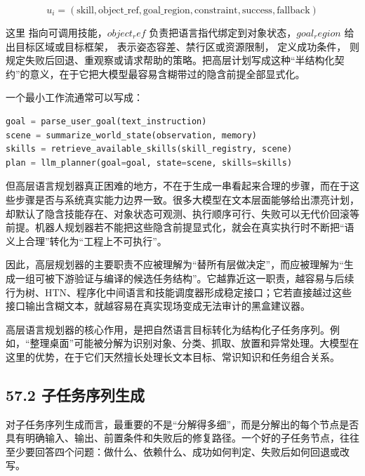 \begingroup
\scriptsize
\begin{equation*}
u_i = (\text{skill}, \text{object\_ref}, \text{goal\_region}, \text{constraint}, \text{success}, \text{fallback})
\end{equation*}
\endgroup

这里 \texttt{} 指向可调用技能，\(object_ref\) 负责把语言指代绑定到对象状态，\(goal_region\) 给出目标区域或目标框架，\texttt{} 表示姿态容差、禁行区或资源限制，\texttt{} 定义成功条件，\texttt{} 则规定失败后回退、重观察或请求帮助的策略。把高层计划写成这种“半结构化契约”的意义，在于它把大模型最容易含糊带过的隐含前提全部显式化。

一个最小工作流通常可以写成：

\begin{lstlisting}[language=python]
goal = parse_user_goal(text_instruction)
scene = summarize_world_state(observation, memory)
skills = retrieve_available_skills(skill_registry, scene)
plan = llm_planner(goal=goal, state=scene, skills=skills)
\end{lstlisting}

但高层语言规划器真正困难的地方，不在于生成一串看起来合理的步骤，而在于这些步骤是否与系统真实能力边界一致。很多大模型在文本层面能够给出漂亮计划，却默认了隐含技能存在、对象状态可观测、执行顺序可行、失败可以无代价回滚等前提。机器人规划器若不能把这些隐含前提显式化，就会在真实执行时不断把“语义上合理”转化为“工程上不可执行”。

因此，高层规划器的主要职责不应被理解为“替所有层做决定”，而应被理解为“生成一组可被下游验证与编译的候选任务结构”。它越靠近这一职责，越容易与后续行为树、HTN、程序化中间语言和技能调度器形成稳定接口；它若直接越过这些接口输出含糊文本，就越容易在真实现场变成无法审计的黑盒建议器。

高层语言规划器的核心作用，是把自然语言目标转化为结构化子任务序列。例如，“整理桌面”可能被分解为识别对象、分类、抓取、放置和异常处理。大模型在这里的优势，在于它们天然擅长处理长文本目标、常识知识和任务组合关系。

\subsection*{57.2 子任务序列生成}


对子任务序列生成而言，最重要的不是“分解得多细”，而是分解出的每个节点是否具有明确输入、输出、前置条件和失败后的修复路径。一个好的子任务节点，往往至少要回答四个问题：做什么、依赖什么、成功如何判定、失败后如何回退或改写。

